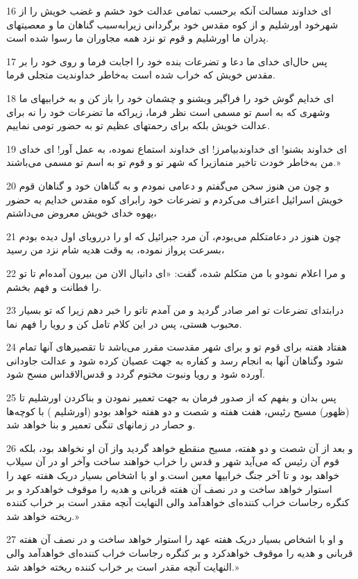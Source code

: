 \par 16 ‌ای خداوند مسالت آنکه برحسب تمامی عدالت خود خشم و غضب خویش را از شهرخود اورشلیم و از کوه مقدس خود برگردانی زیرابه‌سبب گناهان ما و معصیتهای پدران ما اورشلیم و قوم تو نزد همه مجاوران ما رسوا شده است.
\par 17 پس حال‌ای خدای ما دعا و تضرعات بنده خود را اجابت فرما و روی خود را بر مقدس خویش که خراب شده است به‌خاطر خداوندیت متجلی فرما.
\par 18 ‌ای خدایم گوش خود را فراگیر وبشنو و چشمان خود را باز کن و به خرابیهای ما وشهری که به اسم تو مسمی است نظر فرما، زیراکه ما تضرعات خود را نه برای عدالت خویش بلکه برای رحمتهای عظیم تو به حضور تومی نماییم.
\par 19 ‌ای خداوند بشنو! ای خداوندبیامرز! ای خداوند استماع نموده، به عمل آور! ای خدای من به‌خاطر خودت تاخیر منمازیرا که شهر تو و قوم تو به اسم تو مسمی می‌باشند.»
\par 20 و چون من هنوز سخن می‌گفتم و دعامی نمودم و به گناهان خود و گناهان قوم خویش اسرائیل اعتراف می‌کردم و تضرعات خود رابرای کوه مقدس خدایم به حضور یهوه خدای خویش معروض می‌داشتم،
\par 21 چون هنوز در دعامتکلم می‌بودم، آن مرد جبرائیل که او را دررویای اول دیده بودم بسرعت پرواز نموده، به وقت هدیه شام نزد من رسید،
\par 22 و مرا اعلام نمودو با من متکلم شده، گفت: «ای دانیال الان من بیرون آمده‌ام تا تو را فطانت و فهم بخشم.
\par 23 درابتدای تضرعات تو امر صادر گردید و من آمدم تاتو را خبر دهم زیرا که تو بسیار محبوب هستی، پس در این کلام تامل کن و رویا را فهم نما.
\par 24 هفتاد هفته برای قوم تو و برای شهر مقدست مقرر می‌باشد تا تقصیرهای آنها تمام شود وگناهان آنها به انجام رسد و کفاره به جهت عصیان کرده شود و عدالت جاودانی آورده شود و رویا ونبوت مختوم گردد و قدس‌الاقداس مسح شود.
\par 25 پس بدان و بفهم که از صدور فرمان به جهت تعمیر نمودن و بناکردن اورشلیم تا (ظهور) مسیح رئیس، هفت هفته و شصت و دو هفته خواهد بودو (اورشلیم ) با کوچه‌ها و حصار در زمانهای تنگی تعمیر و بنا خواهد شد.
\par 26 و بعد از آن شصت و دو هفته، مسیح منقطع خواهد گردید واز آن او نخواهد بود، بلکه قوم آن رئیس که می‌آید شهر و قدس را خراب خواهند ساخت وآخر او در آن سیلاب خواهد بود و تا آخر جنگ خرابیها معین است.و او با اشخاص بسیار دریک هفته عهد را استوار خواهد ساخت و در نصف آن هفته قربانی و هدیه را موقوف خواهدکرد و بر کنگره رجاسات خراب کننده‌ای خواهدآمد والی النهایت آنچه مقدر است بر خراب کننده ریخته خواهد شد.»
\par 27 و او با اشخاص بسیار دریک هفته عهد را استوار خواهد ساخت و در نصف آن هفته قربانی و هدیه را موقوف خواهدکرد و بر کنگره رجاسات خراب کننده‌ای خواهدآمد والی النهایت آنچه مقدر است بر خراب کننده ریخته خواهد شد.»

